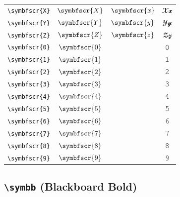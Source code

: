 \documentclass[12pt,a4paper]{article}
\begin{document}
\begin{longtable}{|c|c|c|c|}
\verb|\symbfscr{X}| & $\symbfscr{X}$ & $\symbfscr{x}$ & $ 𝓧 𝔁 $ \\
\verb|\symbfscr{Y}| & $\symbfscr{Y}$ & $\symbfscr{y}$ & $ 𝓨 𝔂 $ \\
\verb|\symbfscr{Z}| & $\symbfscr{Z}$ & $\symbfscr{z}$ & $ 𝓩 𝔃 $ \\
\verb|\symbfscr{0}| & $\symbfscr{0}$ & & 𝟶 \\
\verb|\symbfscr{1}| & $\symbfscr{1}$ & & 𝟷 \\
\verb|\symbfscr{2}| & $\symbfscr{2}$ & & 𝟸 \\
\verb|\symbfscr{3}| & $\symbfscr{3}$ & & 𝟹 \\
\verb|\symbfscr{4}| & $\symbfscr{4}$ & & 𝟺 \\
\verb|\symbfscr{5}| & $\symbfscr{5}$ & & 𝟻 \\
\verb|\symbfscr{6}| & $\symbfscr{6}$ & & 𝟼 \\
\verb|\symbfscr{7}| & $\symbfscr{7}$ & & 𝟽 \\
\verb|\symbfscr{8}| & $\symbfscr{8}$ & & 𝟾 \\
\verb|\symbfscr{9}| & $\symbfscr{9}$ & & 𝟿 \\
\hline
\end{longtable}

\newpage

\subsection*{\texttt{\textbackslash{}symbb} (Blackboard Bold)}
\end{document}
